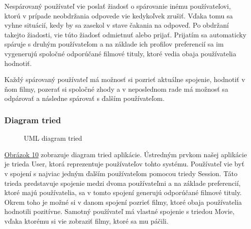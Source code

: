 Nespárovaný používateľ vie poslať žiadosť o spárovanie inému používateľovi, ktorú v prípade neobdržania odpovede vie kedykoľvek zrušiť. Vďaka tomu sa vyhne situácií, kedy by sa zasekol v stave čakania na odpoveď. Po obdržaní takejto žiadosti, vie túto žiadosť odmietnuť alebo prijať. Prijatím sa automaticky spáruje s druhým používateľom a na základe ich profilov preferencií sa im vygenerujú spoločné odporúčané filmové tituly, ktoré vedia obaja používatelia hodnotiť. 

Každý spárovaný používateľ má možnosť si pozrieť aktuálne spojenie, hodnotiť v ňom filmy, pozerať si spoločné zhody a v neposlednom rade má možnosť sa odpárovať a následne spárovať s ďalším používateľom. 

\subsubsection{Diagram tried}
\begin{figure}[hbt!]
  \centering  
  \def\stackalignment{c}
           {\scriptsize}
	\caption{UML diagram tried}  
  \label{classdiagram}
\end{figure}
\hyperref[classdiagram]{Obrázok 10} zobrazuje diagram tried aplikácie. Ústredným prvkom našej aplikácie je trieda User, ktorá reprezentuje používateľov tohto systému. Používateľ vie byť v spojení s najviac jedným ďalším používateľom pomocou triedy Session. Táto trieda predstavuje spojenie medzi dvoma používateľmi a na základe preferencií, ktoré majú používatelia, sa v tomto spojení generujú odporúčané filmové tituly. Okrem toho je možné si v danom spojení pozrieť filmy, ktoré obaja používatelia hodnotili pozitívne. Samotný používateľ má vlastné spojenie s triedou Movie, vďaka ktorému si vie zobraziť filmy, ktoré sa mu páčili.

